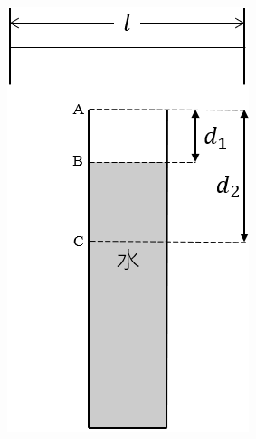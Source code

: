 \begin{figure}[htbp]
\begin{minipage}{.25\columnwidth}
    \includegraphics[width=\columnwidth]{../graphs/osaka_ko_23_3-2.png}
    \caption{}
  \end{minipage}
  \begin{minipage}{.25\columnwidth}
    \centering

\end{minipage}
\end{figure}
